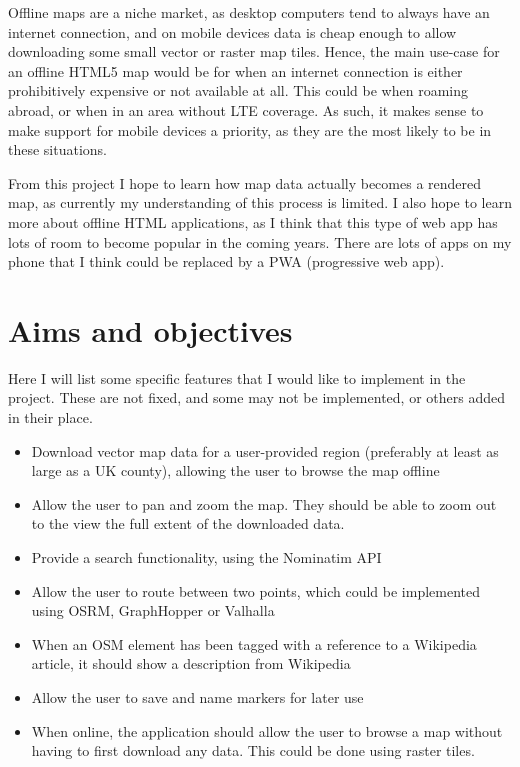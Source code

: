 \documentclass[]{final_report}
\begin{document}
Offline maps are a niche market, as desktop computers tend to always have an internet connection, and on mobile devices data is cheap enough to allow downloading some small vector or raster map tiles. Hence, the main use-case for an offline HTML5 map would be for when an internet connection is either prohibitively expensive or not available at all. This could be when roaming abroad, or when in an area without LTE coverage. As such, it makes sense to make support for mobile devices a priority, as they are the most likely to be in these situations.

From this project I hope to learn how map data actually becomes a rendered map, as currently my understanding of this process is limited. I also hope to learn more about offline HTML applications, as I think that this type of web app has lots of room to become popular in the coming years. There are lots of apps on my phone that I think could be replaced by a PWA (progressive web app).

\chapter{Aims and objectives}

Here I will list some specific features that I would like to implement in the project. These are not fixed, and some may not be implemented, or others added in their place.

\begin{itemize}
    \item Download vector map data for a user-provided region (preferably at least as large as a UK county), allowing the user to browse the map offline
    \item Allow the user to pan and zoom the map. They should be able to zoom out to the view the full extent of the downloaded data.
    \item Provide a search functionality, using the Nominatim API
    \item Allow the user to route between two points, which could be implemented using OSRM, GraphHopper or Valhalla
    \item When an OSM element has been tagged with a reference to a Wikipedia article, it should show a description from Wikipedia
    \item Allow the user to save and name markers for later use
    \item When online, the application should allow the user to browse a map without having to first download any data. This could be done using raster tiles.
\end{itemize}
\end{document}
